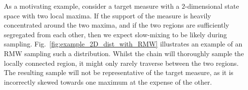 
As a motivating example, consider a target measure with a $2$-dimensional state space with two local maxima. If the support of the measure is heavily concentrated around the two maxima, and if the two regions are sufficiently segregated from each other, then we expect slow-mixing to be likely during sampling. Fig.~\ref{fig:example_2D_dist_with_RMW} illustrates an example of an RMW sampling such a distribution. Whilst the chain will thoroughly sample the locally connected region, it might only rarely traverse between the two regions. The resulting sample will not be representative of the target measure, as it is incorrectly skewed towards one maximum at the expense of the other.

